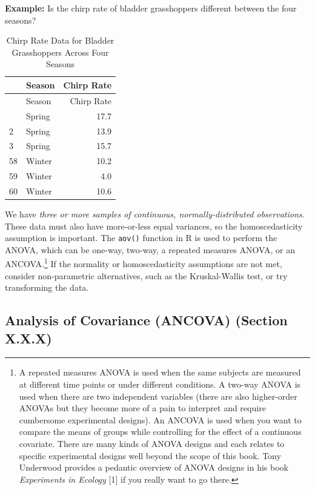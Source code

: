 \documentclass[
  letterpaper,
]{book}
\begin{document}
\textbf{Example:} Is the chirp rate of bladder grasshoppers different
between the four seasons?

\begin{longtable}[]{@{}llr@{}}
\caption{Chirp Rate Data for Bladder Grasshoppers Across Four
Seasons}\tabularnewline
\toprule\noalign{}
& Season & Chirp Rate \\
\midrule\noalign{}
\endfirsthead
\toprule\noalign{}
& Season & Chirp Rate \\
\midrule\noalign{}
\endhead
\bottomrule\noalign{}
\endlastfoot
1 & Spring & 17.7 \\
2 & Spring & 13.9 \\
3 & Spring & 15.7 \\
58 & Winter & 10.2 \\
59 & Winter & 4.0 \\
60 & Winter & 10.6 \\
\end{longtable}

We have \emph{three or more samples of continuous, normally-distributed
observations}. These data must also have more-or-less equal variances,
so the homoscedasticity assumption is important. The \texttt{aov()}
function in R is used to perform the ANOVA, which can be one-way,
two-way, a repeated measures ANOVA, or an ANCOVA.\footnote{A repeated
  measures ANOVA is used when the same subjects are measured at
  different time points or under different conditions. A two-way ANOVA
  is used when there are two independent variables (there are also
  higher-order ANOVAs but they become more of a pain to interpret and
  require cumbersome experimental designs). An ANCOVA is used when you
  want to compare the means of groups while controlling for the effect
  of a continuous covariate. There are many kinds of ANOVA designs and
  each relates to specific experimental designs well beyond the scope of
  this book. Tony Underwood provides a pedantic overview of ANOVA
  designs in his book \emph{Experiments in Ecology} {[}1{]} if you
  really want to go there.} If the normality or homoscedasticity
assumptions are not met, consider non-parametric alternatives, such as
the Kruskal-Wallis test, or try transforming the data.

\subsection{Analysis of Covariance (ANCOVA) (Section
X.X.X)}\label{analysis-of-covariance-ancova-section-x.x.x}
\end{document}
